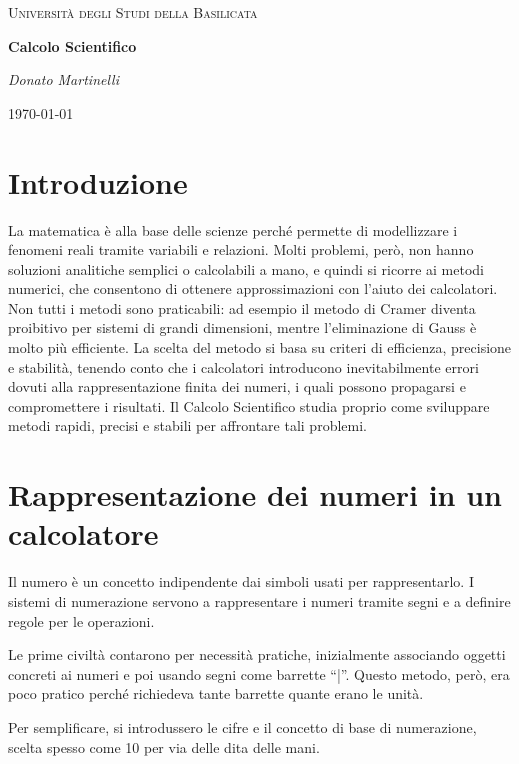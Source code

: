 \documentclass[a4paper,12pt]{article}
\theoremstyle{plain}
\theoremstyle{definition}
\theoremstyle{remark}
\begin{document}
\begin{titlepage}
    \centering
    {\textsc{Università degli Studi della Basilicata} \par}
    \vspace{2cm}
    {\huge\bfseries Calcolo Scientifico\par}
    
    \vfill
    {\Large\itshape Donato Martinelli\par}
    {\large \today\par}
\end{titlepage}

\tableofcontents

\section{Introduzione}

La matematica è alla base delle scienze perché permette di modellizzare i fenomeni reali tramite 
variabili e relazioni. Molti problemi, però, non hanno soluzioni analitiche semplici o calcolabili 
a mano, e quindi si ricorre ai metodi numerici, che consentono di ottenere approssimazioni con 
l'aiuto dei calcolatori. Non tutti i metodi sono praticabili: ad esempio il metodo di Cramer diventa 
proibitivo per sistemi di grandi dimensioni, mentre l'eliminazione di Gauss è molto più efficiente. 
La scelta del metodo si basa su criteri di efficienza, precisione e stabilità, tenendo conto che i 
calcolatori introducono inevitabilmente errori dovuti alla rappresentazione finita dei numeri, i 
quali possono propagarsi e compromettere i risultati.
Il Calcolo Scientifico studia proprio come sviluppare metodi 
rapidi, precisi e stabili per affrontare tali problemi.

\section{Rappresentazione dei numeri in un calcolatore}

Il numero è un concetto indipendente dai simboli usati per rappresentarlo. 
I sistemi di numerazione servono a rappresentare i numeri tramite segni e a 
definire regole per le operazioni.

Le prime civiltà contarono per necessità pratiche, inizialmente associando oggetti concreti ai 
numeri e poi usando segni come barrette “|”. Questo metodo, però, era poco pratico perché richiedeva 
tante barrette quante erano le unità.

Per semplificare, si introdussero le cifre e il concetto di base di numerazione, scelta spesso 
come 10 per via delle dita delle mani.
\end{document}
